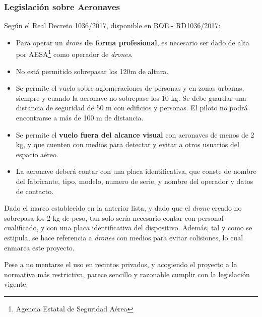 \subsubsection{Legislación sobre Aeronaves}
Según el Real Decreto 1036/2017, disponible en \href{https://www.seguridadaerea.gob.es/media/4629426/rd_1036_17_rpas.pdf}{BOE - RD1036/2017}:
\begin{itemize}
\item Para operar un \emph{drone} \textbf{de forma profesional}, es necesario ser dado de alta por AESA\footnote{Agencia Estatal de Seguridad Aérea} como operador de \emph{drones}.
\item No está permitido sobrepasar los 120m de altura.
\item Se permite el vuelo sobre aglomeraciones de personas y en zonas urbanas, siempre y cuando la aeronave no sobrepase los 10 kg. Se debe guardar una distancia de seguridad de 50 m con edificios y personas. El piloto no podrá encontrarse a más de 100 m de distancia.
\item Se permite el \textbf{vuelo fuera del alcance visual} con aeronaves de menos de 2 kg, y que cuenten con medios para detectar y evitar a otros usuarios del espacio aéreo. 
\item La aeronave deberá contar con una placa identificativa, que conste de nombre del fabricante, tipo, modelo, numero de serie, y nombre del operador y datos de contacto.
\end{itemize}

Dado el marco establecido en la anterior lista, y dado que el \emph{drone} creado no sobrepasa los 2 kg de peso, tan solo sería necesario contar con personal cualificado, y con una placa identificativa del dispositivo. Además, tal y como se estipula, se hace referencia a \emph{drones} con medios para evitar colisiones, lo cual enmarca este proyecto. 

Pese a no mentarse el uso en recintos privados, y acogiendo el proyecto a la normativa más restrictiva, parece sencillo y razonable cumplir con la legislación vigente. 


